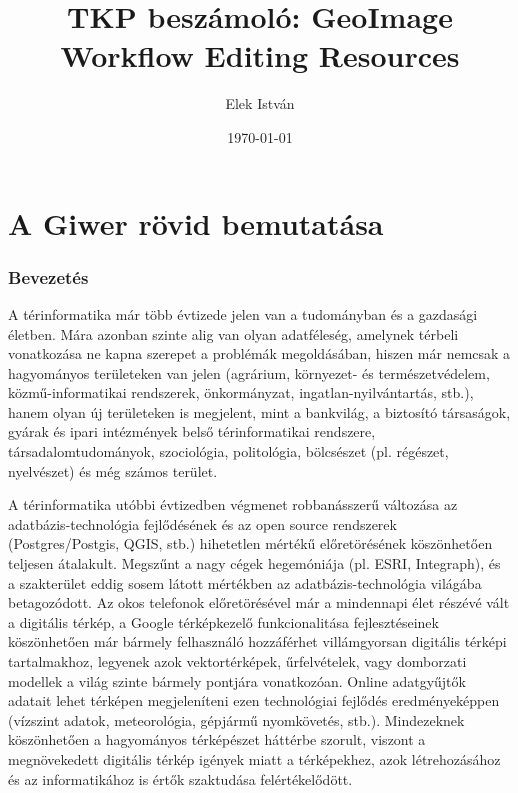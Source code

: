 \documentclass[a4paper,12pt]{article}
\begin{document}
\author{Elek István}
\title{TKP beszámoló: \linebreak \linebreak GeoImage Workflow Editing Resources \linebreak}
\date{\today}


\setcounter{tocdepth}{3}
\maketitle
\newpage
\tableofcontents
\newpage

\part{A Giwer rövid bemutatása}

\section{Bevezetés}

A térinformatika már több évtizede jelen van a tudományban és a gazdasági életben. Mára azonban szinte alig van olyan adatféleség, amelynek térbeli vonatkozása ne kapna szerepet a problémák megoldásában, hiszen már nemcsak a hagyományos területeken van jelen (agrárium, környezet- és természetvédelem, közmű-informatikai rendszerek, önkormányzat, ingatlan-nyilvántartás, stb.), hanem olyan új területeken is megjelent, mint a bankvilág, a biztosító társaságok, gyárak és ipari intézmények belső térinformatikai rendszere, társadalomtudományok, szociológia, politológia, bölcsészet (pl. régészet, nyelvészet) és még számos terület.

A térinformatika utóbbi évtizedben végmenet robbanásszerű változása az adatbázis-technológia fejlődésének és az open source rendszerek (Postgres/Postgis, QGIS, stb.) hihetetlen mértékű előretörésének köszönhetően teljesen átalakult. Megszűnt a nagy cégek hegemóniája (pl. ESRI, Integraph), és a szakterület eddig sosem látott mértékben az adatbázis-technológia világába betagozódott. Az okos telefonok előretörésével már a mindennapi élet részévé vált a digitális térkép, a Google térképkezelő funkcionalitása fejlesztéseinek köszönhetően már bármely felhasználó hozzáférhet villámgyorsan digitális térképi tartalmakhoz, legyenek azok vektortérképek, űrfelvételek, vagy domborzati modellek a világ szinte bármely pontjára vonatkozóan. Online adatgyűjtők adatait lehet térképen megjeleníteni ezen technológiai fejlődés eredményeképpen (vízszint adatok, meteorológia, gépjármű nyomkövetés, stb.). Mindezeknek köszönhetően a hagyományos térképészet háttérbe szorult, viszont a megnövekedett digitális térkép igények miatt a térképekhez, azok létrehozásához és az informatikához is értők szaktudása felértékelődött.
\end{document}
